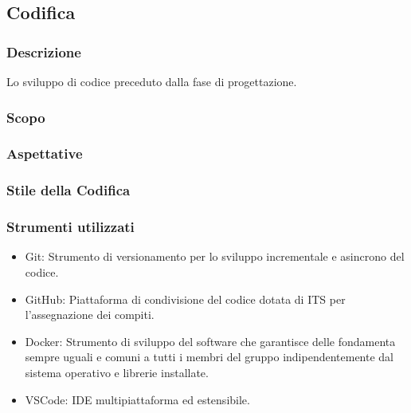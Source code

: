 \subsection{Codifica}

\subsubsection{Descrizione}
Lo sviluppo di codice preceduto dalla fase di progettazione.

\subsubsection{Scopo}
\subsubsection{Aspettative}

\subsubsection{Stile della Codifica}

\subsubsection{Strumenti utilizzati}
    \begin{itemize}
    \item Git: Strumento di versionamento per lo sviluppo incrementale e asincrono del codice.
    \item GitHub: Piattaforma di condivisione del codice dotata di ITS per l'assegnazione dei compiti.
    \item Docker: Strumento di sviluppo del software che garantisce delle fondamenta sempre uguali
      e comuni a tutti i membri del gruppo indipendentemente dal sistema operativo e librerie installate.
    \item VSCode: IDE multipiattaforma ed estensibile.
    \end{itemize}

